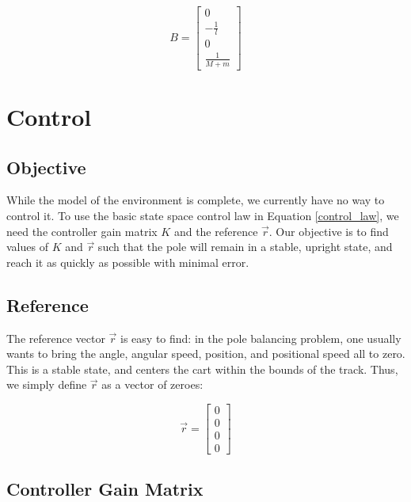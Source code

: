 \documentclass[12pt]{article}
\begin{document}
\begin{equation}
    \displaystyle B = \begin{bmatrix}
        0 \\
        - \frac{1}{l} \\
        0 \\
        \frac{1}{M + m}
    \end{bmatrix}
\end{equation}

\section{Control}

\subsection{Objective}

While the model of the environment is complete, we currently have no way to control it. To use the basic state space control law in Equation \ref{control_law}, we need the controller gain matrix $K$ and the reference $\vec{r}$. Our objective is to find values of $K$ and $\vec{r}$ such that the pole will remain in a stable, upright state, and reach it as quickly as possible with minimal error.

\subsection{Reference}

The reference vector $\vec{r}$ is easy to find: in the pole balancing problem, one usually wants to bring the angle, angular speed, position, and positional speed all to zero. This is a stable state, and centers the cart within the bounds of the track. Thus, we simply define $\vec{r}$ as a vector of zeroes:

\begin{equation}
    \displaystyle
    \vec{r} = \begin{bmatrix}
        0 \\
        0 \\
        0 \\
        0
    \end{bmatrix}
\end{equation}

\subsection{Controller Gain Matrix}
\end{document}
